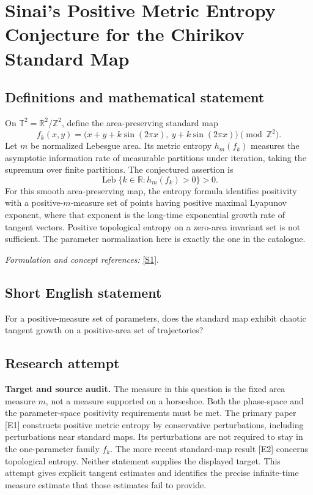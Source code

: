 \documentclass[11pt]{article}
\begin{document}
\section*{\texorpdfstring{Sinai's Positive Metric Entropy Conjecture for the Chirikov Standard Map}{Sinai's Positive Metric Entropy Conjecture for the Chirikov Standard Map}}\label{statement}
\subsection{Definitions and mathematical statement}
On $\mathbb T^2={\mathbb{R}}^2/{\mathbb{Z}}^2$, define the area-preserving standard map
\[
 f_k(x,y)=\bigl(x+y+k\sin(2\pi x),\ y+k\sin(2\pi x)\bigr)\pmod{{\mathbb{Z}}^2}.
\]
Let $m$ be normalized Lebesgue area. Its metric entropy $h_m(f_k)$ measures the asymptotic information rate of measurable partitions under iteration, taking the supremum over finite partitions. The conjectured assertion is
\[
 \operatorname{Leb}\{k\in{\mathbb{R}}:h_m(f_k)>0\}>0.
\]
For this smooth area-preserving map, the entropy formula identifies positivity with a positive-$m$-measure set of points having positive maximal Lyapunov exponent, where that exponent is the long-time exponential growth rate of tangent vectors. Positive topological entropy on a zero-area invariant set is not sufficient. The parameter normalization here is exactly the one in the catalogue.
\par\smallskip\textit{Formulation and concept references:} \href{https://www.math.uci.edu/~asgor/Psim076.pdf}{[S1]}.

\subsection{Short English statement}
For a positive-measure set of parameters, does the standard map exhibit chaotic tangent growth on a positive-area set of trajectories?
\subsection{Research attempt}
\textbf{Target and source audit.}
The measure in this question is the fixed area measure $m$, not a measure
supported on a horseshoe.  Both the phase-space and the parameter-space
positivity requirements must be met.  The primary paper [E1] constructs
positive metric entropy by conservative perturbations, including perturbations
near standard maps.  Its perturbations are not required to stay in the
one-parameter family $f_k$.  The more recent standard-map result [E2] concerns
topological entropy.  Neither statement supplies the displayed target.  This
attempt gives explicit tangent estimates and identifies the precise infinite-time
measure estimate that those estimates fail to provide.
\end{document}

